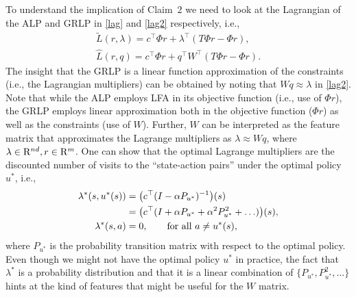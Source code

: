 To understand the implication of Claim~$2$ we need to look at the Lagrangian of the ALP and GRLP in \eqref{lag} and \eqref{lag2} respectively, i.e., 
\begin{align}\label{lag}
\tilde{L}(r,\lambda)=c^\top \Phi r+\lambda^\top (T\Phi r-\Phi r), \\ \label{lag2}\hat{L}(r,q)=c^\top \Phi r+q^\top W^\top (T\Phi r-\Phi r).
\end{align}
The insight that the GRLP is a linear function approximation of the constraints (i.e., the Lagrangian multipliers) can be obtained by noting that $ Wq\approx \lambda$ in \eqref{lag2}. Note that while the ALP employs LFA in its objective function (i.e., use of $\Phi r$), the GRLP employs linear approximation both in the objective function ($\Phi r$) as well as the constraints (use of $W$). Further, $W$ can be interpreted as the feature matrix that approximates the Lagrange multipliers as $\lambda\approx Wq$, where $\lambda \in \mathrm{R}^{nd}, r\in \mathrm{R}^m$. One can show \cite{dolgov} that the optimal Lagrange multipliers are the discounted number of visits to the ``state-action pairs'' under the optimal policy $u^*$, i.e., 
\begin{align}
\lambda^*(s,u^*(s))&=\big(c^\top(I-\alpha P_{u^*})^{-1}\big)(s)\nonumber\\
				&= \big(c^\top(I+\alpha P_{u^*}+\alpha^2 P_{u^*}^2+\ldots)\big)(s),\nonumber\\
			\lambda^*(s,a)&=0, \qquad \text{for all } a \neq u^*(s),\nonumber
\end{align}
where $P_{u^*}$ is the probability transition matrix with respect to the optimal policy. Even though we might not have the optimal policy $u^*$ in practice, the fact that $\lambda^*$ is a probability distribution and that it is a linear combination of $\{P_{u^*},P^2_{u^*},\ldots\}$ hints at the kind of features that might be useful for the $W$ matrix.\\
